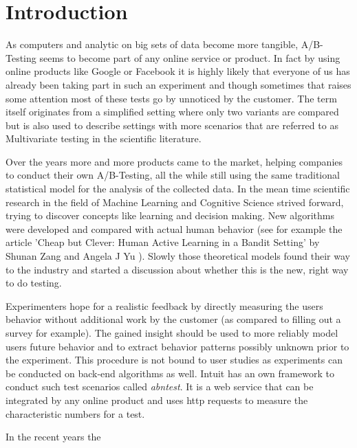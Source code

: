 \documentclass[main.tex]{subfiles}
\begin{document}
\chapter{Introduction}
As computers and analytic on big sets of data become more tangible, A/B-Testing seems to become part of any online service or product. In fact by using online products like Google or Facebook it is highly likely that everyone of us has already been taking part in such an experiment and though sometimes that raises some attention \cite{arthur2014facebook} most of these tests go by unnoticed by the customer. The term itself originates from a simplified setting where only two variants are compared but is also used to describe settings with more scenarios that are referred to as Multivariate testing in the scientific literature. 

Over the years more and more products came to the market, helping companies to conduct their own A/B-Testing, all the while still using the same traditional statistical model for the analysis of the collected data. In the mean time scientific research in the field of Machine Learning and Cognitive Science strived forward, trying to discover concepts like learning and decision making. New algorithms were developed and compared with actual human behavior (see for example the article 'Cheap but Clever: Human Active Learning in a Bandit Setting' by Shunan Zang and Angela J Yu \cite{zhang2013cheap}). Slowly those theoretical models found their way to the industry and started a discussion about whether this is the new, right way to do testing.

Experimenters hope for a realistic feedback by directly measuring the users behavior without additional work by the customer (as compared to filling out a survey for example). The gained insight should be used to more reliably model users future behavior and to extract behavior patterns possibly unknown prior to the experiment. This procedure is not bound to user studies as experiments can be conducted on back-end algorithms as well. Intuit has an own framework to conduct such test scenarios called \emph{abntest}. It is a web service that can be integrated by any online product and uses http requests to measure the characteristic numbers for a test.

In the recent years the
\end{document}

